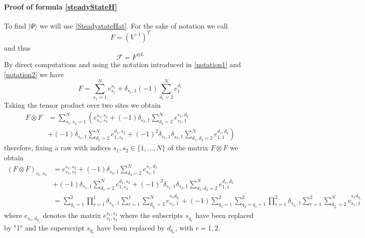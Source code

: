 \documentclass[11pt]{article}
\numberwithin{equation}{section}
\numberwithin{equation}{subsection}
\begin{document}
\paragraph{Proof of formula \eqref{steadyStateH}} To find $|\Psi\rangle$ we will use \eqref{SteadystateHat}. For the sake of notation we call
\begin{equation}
    F=\left(V^{-1}\right)^{T}
\end{equation}
and thus 
\begin{equation}
    \mathcal{F}=F^{\otimes L}
\end{equation}
By direct computations and using the notation introduced in \eqref{notation1} and \eqref{notation2} we have 
\begin{equation}
    F=\sum_{s_{1}=1}^{N}e_{s_{1}}^{s_{1}}+\delta_{s_{1},1}(-1)\sum_{d_{1}=2}^{N}e_{1}^{d_{1}}
\end{equation}
Taking the tensor product over two sites we obtain 
\begin{equation}
\begin{split}
    F\otimes F&=\sum_{s_{1},s_{2}=1}^{N}\left(e_{s_{1},s_{2}}^{s_{1},s_{2}}+(-1)\delta_{s_{2},1}\sum_{d_{2}=2}^{N}e_{s_{1},1}^{s_{1},d_{2}}
     \right.\\ &+\left. 
    (-1)\delta_{s_{1},1}\sum_{d_{1}=2}^{N}e_{1,s_{2}}^{d_{1},s_{2}}+(-1)^{2}\delta_{s_{1},1}\delta_{s_{2},1}\sum_{d_{1},d_{2}=2}^{N}e_{1,1}^{d_{1},d_{2}}\right)
    \end{split}
\end{equation}
therefore, fixing a raw with indices $s_{1},s_{2}\in \{1,\ldots,N\}$ of the matrix $F\otimes F$ we obtain 
\begin{equation}
\begin{split}
    \left(F\otimes F\right)_{s_{1},s_{2}}&=e_{s_{1},s_{2}}^{s_{1},s_{2}}+(-1)\delta_{s_{2},1}\sum_{d_{2}=2}^{N}e_{s_{1},1}^{s_{1},d_{2}}
    \\&+
    (-1)\delta_{s_{1},1}\sum_{d_{1}=2}^{N}e_{1,s_{2}}^{d_{1},s_{2}}+(-1)^{2}\delta_{s_{1},1}\delta_{s_{2},1}\sum_{d_{1},d_{2}=2}^{N}e_{1,1}^{d_{1},d_{2}}
    \\&=
    \sum_{q_{1}=1}^{2}\prod_{r=1}^{1}\delta_{s_{q_{r}},1}\sum_{r=1}^{1}\sum_{d_{q_{r}}=2}^{N}e_{s_{x},1}^{s_{x}d_{q_{r}}}
    +
    (-1)\sum_{q_{1}=1}^{2}\sum_{q_{2}=q_{1}+1}^{2}\prod_{r=1}^{2}\delta_{s_{q_{r}},1}\sum_{r=1}^{2}\sum_{d_{q_{r}}=2}^{N}e_{s_{x},1}^{s_{x}d_{q_{r}}}
    \end{split}
\end{equation}
where $e_{s_{x},d_{q_{r}}}$ denotes the matrix $e_{s_{1},s_{2}}^{s_{1},s_{2}}$ where the subscripts $s_{q_{r}}$ have been replaced by "1" and the superscript $s_{q_{r}}$ have been replaced by $d_{q_{r}}$, with $r=1,2$. \\
\end{document}

